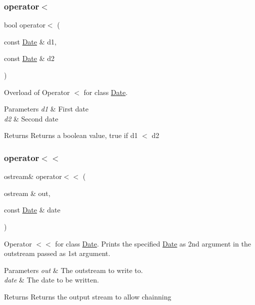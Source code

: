 \subsubsection{\texorpdfstring{operator$<$}{operator<}}
{\footnotesize\ttfamily bool operator$<$ (\begin{DoxyParamCaption}\item[{const \hyperlink{class_date}{Date} \&}]{d1,  }\item[{const \hyperlink{class_date}{Date} \&}]{d2 }\end{DoxyParamCaption})\hspace{0.3cm}{\ttfamily [friend]}}

Overload of Operator $<$ for class \hyperlink{class_date}{Date}. 
\begin{DoxyParams}{Parameters}
{\em d1} & First date \\
\hline
{\em d2} & Second date \\
\hline
\end{DoxyParams}
\begin{DoxyReturn}{Returns}
Returns a boolean value, true if d1 $<$ d2 
\end{DoxyReturn}
\mbox{\label{class_date_a5c29d00ecf33e6d232a410f1f3d6eb70}} 
\subsubsection{\texorpdfstring{operator$<$$<$}{operator<<}}
{\footnotesize\ttfamily ostream\& operator$<$$<$ (\begin{DoxyParamCaption}\item[{ostream \&}]{out,  }\item[{const \hyperlink{class_date}{Date} \&}]{date }\end{DoxyParamCaption})\hspace{0.3cm}{\ttfamily [friend]}}

Operator $<$$<$ for class \hyperlink{class_date}{Date}. Prints the specified \hyperlink{class_date}{Date} as 2nd argument in the outstream passed as 1st argument. 
\begin{DoxyParams}{Parameters}
{\em out} & The outstream to write to. \\
\hline
{\em date} & The date to be written. \\
\hline
\end{DoxyParams}
\begin{DoxyReturn}{Returns}
Returns the output stream to allow chainning 
\end{DoxyReturn}
\mbox{\label{class_date_a4f314b2216e8760eac284385a7eaae12}} 
